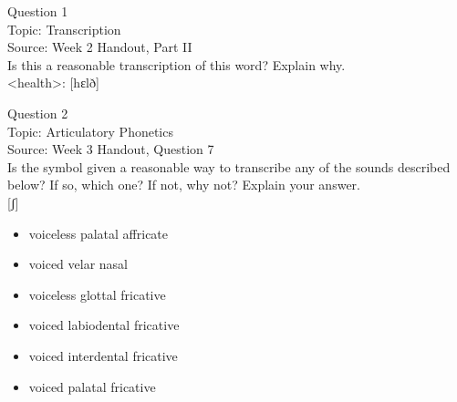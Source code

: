 \documentclass[12pt]{article}
\begin{document}
\begin{center}
\textbf{{\color{violet}{\HUGE 20201029 Thursday\\}}}

\textbf{{\color{violet}{\HUGE ALL EXAMS\\}}}

\end{center}
\newpage

\begin{center}
\textbf{{\color{blue}{\HUGE START OF EXAM\\}}}

\textbf{{\color{blue}{\HUGE Student ID: 10699\\}}}

\textbf{{\color{blue}{\HUGE \\}}}

\end{center}
\newpage

{\large Question 1}\\

Topic: Transcription\\
Source: Week 2 Handout, Part II\\

Is this a reasonable transcription of this word? Explain why.\\

<health>: {[hɛlð]}


\newpage

{\large Question 2}\\

Topic: Articulatory Phonetics\\
Source: Week 3 Handout, Question 7\\

Is the symbol given a reasonable way to transcribe any of the sounds described below? If so, which one? If not, why not? Explain your answer.\\

{[ʃ]}

\begin{itemize} \item voiceless palatal affricate \item voiced velar nasal \item voiceless glottal fricative \item voiced labiodental fricative \item voiced interdental fricative \item voiced palatal fricative \end{itemize}
\end{document}
